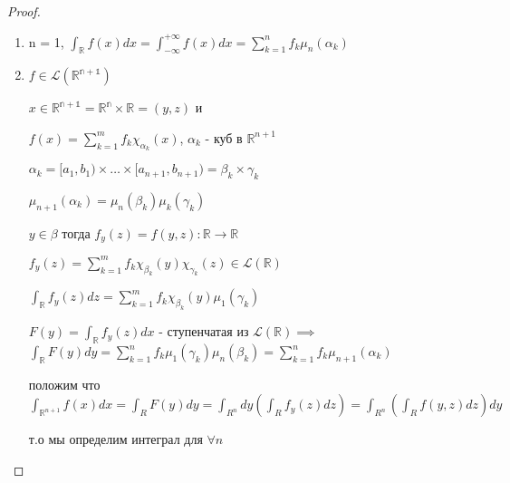 \documentclass[a4paper]{article}
\theoremstyle{definition}
\theoremstyle{remark}
\begin{document}
\begin{proof}
     \begin{enumerate}
          \item n = 1, $\int_\mathbb{R} f(x)dx = \int_{-\infty}^{+\infty}f(x)dx = \sum_{k=1}^n f_k \mu_n(\alpha_k)$
          \item $f\in\mathcal{L}(\mathbb{R^{n+1}})$
          
          $x\in\mathbb{R^{n+1}} = \mathbb{R^{n}}\times\mathbb{R} = (y, z)$ и

          $f(x) = \sum_{k =1}^m f_k \chi_{\alpha_k}(x)$, $\alpha_k$ - куб в $\mathbb{R} ^{n+1}$

          $\alpha_k = [a_1, b_1)\times\dots\times[a_{n+1}, b_{n+1}) = \beta_k\times\gamma_k$

          $\mu_{n+1}(\alpha_k) = \mu_n(\beta_k)\mu_k(\gamma_k)$

          $y\in\beta$ тогда $f_y(z) = f(y, z): \mathbb{R} \to\mathbb{R} $

          $f_y(z) = \sum_{k=1}^m f_k \chi_{\beta_k}(y)\chi_{\gamma_k}(z) \in \mathcal{L}(\mathbb{R})$

          $\int_\mathbb{R} f_y(z)dz = \sum_{k=1}^m f_k \chi_{\beta_k}(y)\mu_1(\gamma_k)$

          $F(y) = \int_\mathbb{R} f_y(z)dx$ -  ступенчатая из $\mathcal{L}(\mathbb{R})\implies$
          $\int_\mathbb{R} F(y)dy = \sum_{k=1}^n f_k \mu_1(\gamma_k) \mu_n(\beta_k) = \sum_{k=1}^n f_k \mu_{n+1}(\alpha_k)$

          положим что $\int_{\mathbb{R} ^{n+1}}f(x)dx = \int_R F(y)dy = \int_{R^n} dy (\int_R f_y(z)dz) = \int_{R^n}(\int_R f(y,z)dz)dy$

          т.о мы определим интеграл для $\forall n$
     \end{enumerate}
\end{proof}
\end{document}
